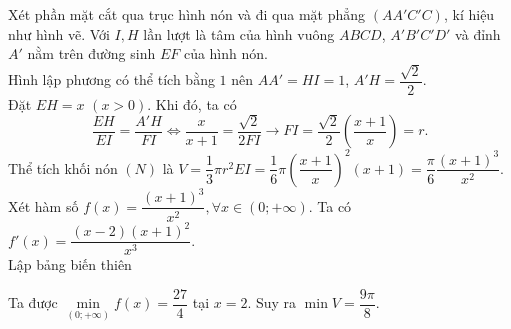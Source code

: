 \begin{ex}
{\begin{center}
\begin{tikzpicture}[scale=1,>=stealth, font=\footnotesize, line join=round, line cap=round]
		\end{tikzpicture}
	\end{center}
	Xét phần mặt cắt qua trục hình nón và đi qua mặt phẳng $(AA'C'C)$, kí hiệu như hình vẽ. Với $I,H$ lần lượt là tâm của hình vuông $ABCD$, $A'B'C'D'$ và đỉnh $A'$ nằm trên đường sinh $EF$ của hình nón.\\
	Hình lập phương có thể tích bằng $1$ nên $AA'=HI=1$, $A'H=\dfrac{\sqrt{2}}{2}$.\\
	Đặt $EH=x$ $(x>0)$. Khi đó, ta có
	$$\dfrac{EH}{EI}=\dfrac{A'H}{FI} \Leftrightarrow \dfrac{x}{x+1}=\dfrac{\sqrt{2}}{2FI}\rightarrow FI=\dfrac{\sqrt{2}}{2}\left(\dfrac{x+1}{x}\right)=r.$$
	Thể tích khối nón $(N)$ là $V=\dfrac{1}{3} \pi r^2 EI=\dfrac{1}{6} \pi\left(\dfrac{x+1}{x}\right)^2(x+1)=\dfrac{\pi}{6} \dfrac{(x+1)^3}{x^2}$.\\
	Xét hàm số $f(x)=\dfrac{(x+1)^3}{x^2}, \forall x\in (0;+\infty)$. Ta có $f'(x)=\dfrac{(x-2)(x+1)^2}{x^3}$.\\
	Lập bảng biến thiên
	\begin{center}
	\end{center}
	Ta được $\min\limits_{(0;+\infty)} f(x)=\dfrac{27}{4}$ tại $x=2$. Suy ra $\min V=\dfrac{9 \pi}{8}$.
}
\end{ex}

